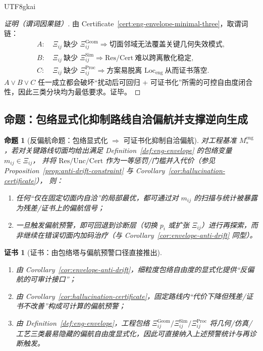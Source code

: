 \documentclass[12pt]{article}
\newtheorem{proposition}{命题}[section]
\newtheorem{certificate}{证书}[section]
\begin{document}
\begin{CJK*}{UTF8}{gkai}
\begin{proof}[证明（谓词因果链）]
由 Certificate~\ref{cert:eng-envelope-minimal-three}，取谓词链：
\[
\begin{aligned}
A:&\ \Xi_{ij}\ \text{缺少 }\Xi_{ij}^{\mathrm{Geom}}
\Rightarrow
\text{切面邻域无法覆盖关键几何失效模式},\\
B:&\ \Xi_{ij}\ \text{缺少 }\Xi_{ij}^{\mathrm{Sim}}
\Rightarrow
\mathrm{Res}/\mathrm{Cert}\ \text{难以跨离散化稳定},\\
C:&\ \Xi_{ij}\ \text{缺少 }\Xi_{ij}^{\mathrm{Proc}}
\Rightarrow
\text{方案易脱离 }\mathrm{Loc}_{\mathrm{eng}}\ \text{从而证书落空}.
\end{aligned}
\]
$A\vee B\vee C$ 任一成立都会破坏“扰动后可回归 + 可证书化”所需的可控自由度闭合性，因此三类分块均为最低要求。证毕。
\end{proof}

\subsection{命题：包络显式化抑制路线自洽偏航并支撑逆向生成}

\begin{proposition}[反偏航命题：包络显式化 $\Rightarrow$ 可证书化抑制自洽偏航]
\label{prop:eng-envelope-anti-drift}
对工程基准 $M_\ast^{\mathrm{eng}}$，若对关键路线切面均给出满足 Definition~\ref{def:eng-envelope} 的包络变量 $m_{ij}\in\Xi_{ij}$，
并将 $\mathrm{Res}/\mathrm{Unc}/\mathrm{Cert}$ 作为一等惩罚/门槛并入代价（参见 Proposition~\ref{prop:anti-drift-constraint} 与
  Corollary~\ref{cor:hallucination-certificate}），
则：
\begin{enumerate}
  \item 任何“仅在固定切面内自洽”的局部最优，都可通过对 $m_{ij}$ 的扫描与统计被暴露为残差/证书上的偏航信号；
  \item 一旦触发偏航预警，即可回退到诊断层（切换 $p_i$ 或扩张 $\Xi_{ij}$）进行再探索，而非继续在错误切面内加码治疗（与 Corollary~\ref{cor:envelope-anti-drift} 同型）。
\end{enumerate}
\end{proposition}

\begin{certificate}[证书：由包络塔与偏航预警口径直接推出]
\label{cert:eng-envelope-anti-drift}
\begin{enumerate}
  \item 由 Corollary~\ref{cor:envelope-anti-drift}，细粒度包络自由度的显式化提供“反偏航的可审计接口”；
  \item 由 Corollary~\ref{cor:hallucination-certificate}，固定路线内“代价下降但残差/证书不改善”构成可计算的偏航预警；
  \item 由 Definition~\ref{def:eng-envelope}，工程包络 $\Xi_{ij}^{\mathrm{Geom}}/\Xi_{ij}^{\mathrm{Sim}}/\Xi_{ij}
    ^{\mathrm{Proc}}$ 将几何/仿真/工艺三类最易隐藏的偏航自由度显式化，因此可直接纳入上述预警统计与再诊断触发。
\end{enumerate}
\end{certificate}


\end{CJK*}
\end{document}
